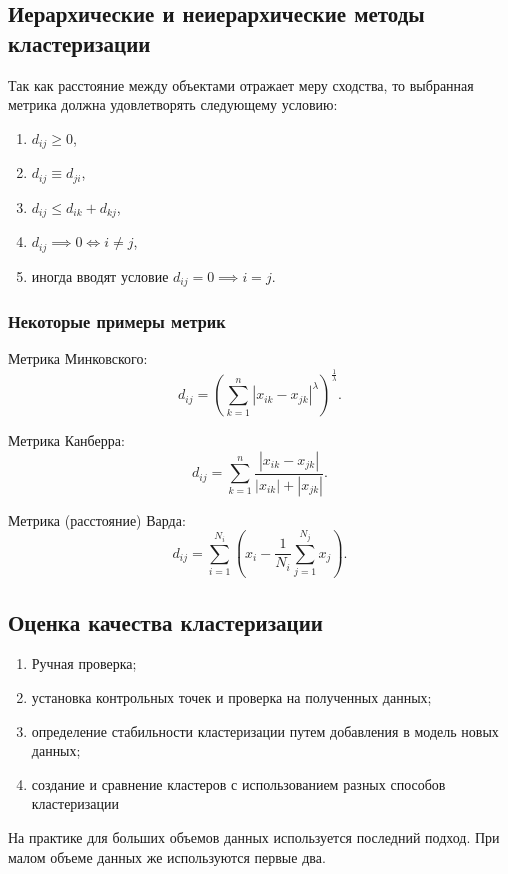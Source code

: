 \documentclass[12pt]{article}
\begin{document}
\subsection{Иерархические и неиерархические методы кластеризации}
Так как расстояние между объектами отражает меру сходства, то выбранная метрика должна удовлетворять следующему условию:
\begin{enumerate}
    \item $d_{ij} \geq 0$,
    \item $d_{ij} \equiv d_{ji}$,
    \item $d_{ij} \leq d_{ik} + d_{kj}$,
    \item $d_{ij} \implies 0 \iff i \neq j$,
    \item иногда вводят условие $d_{ij} = 0 \implies i = j$.\\
\end{enumerate}

\subsubsection{Некоторые примеры метрик}
Метрика Минковского:
\[ d_{ij} = \left( \sum_{k=1}^n | x_{ik} - x_{jk} |^{\lambda} \right)^{\frac{1}{\lambda}}. \]

Метрика Канберра:
\[ d_{ij} = \sum_{k=1}^n\frac{|x_{ik} - x_{jk}|}{|x_{ik}| + |x_{jk}|}.\]

Метрика (расстояние) Варда:
\[ d_{ij} = \sum_{i=1}^{N_i} \left( x_i - \frac{1}{N_i} \sum_{j=1}^{N_j} x_j \right).\]

\subsection{Оценка качества кластеризации}
\begin{enumerate}
    \item Ручная проверка;
    \item установка контрольных точек и проверка на полученных данных;
    \item определение стабильности кластеризации путем добавления в модель новых данных;
    \item создание и сравнение кластеров с использованием разных способов кластеризации  
\end{enumerate}

На практике для больших объемов данных используется последний подход. При малом объеме данных же используются первые два.
\end{document}
